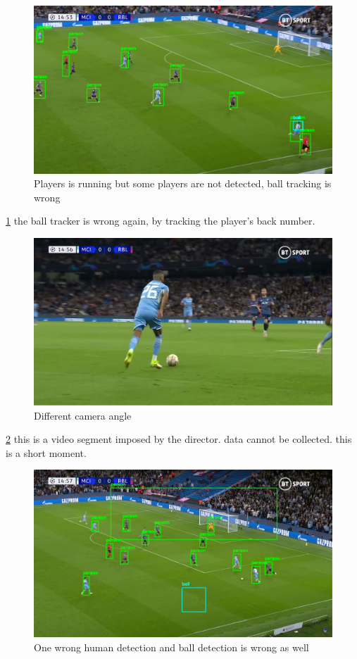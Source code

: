 \documentclass[
11pt,
twoside
]{report}
\begin{document}
\begin{figure}[H]
    \includegraphics[keepaspectratio, width=\columnwidth]{Screenshot_2022-03-03_23-06-18.png}
    \caption{Players is running but some players are not detected, ball tracking is wrong}
    \label{img:9}
\end{figure}
\ref{img:9} the ball
tracker is wrong again, by tracking the player's back number.
\begin{figure}[H]
    \includegraphics[keepaspectratio, width=\columnwidth]{Screenshot_2022-03-03_21-39-53.png}
    \caption{Different camera angle}
    \label{img:10}
\end{figure}
\ref{img:10} this is a
video segment imposed by the director. data cannot be collected. this is a short moment.
\begin{figure}[H]
    \includegraphics[keepaspectratio, width=\columnwidth]{Screenshot_2022-03-03_23-06-43.png}
    \caption{One wrong human detection and ball detection is wrong as well}
    \label{img:11}
\end{figure}
\end{document}
